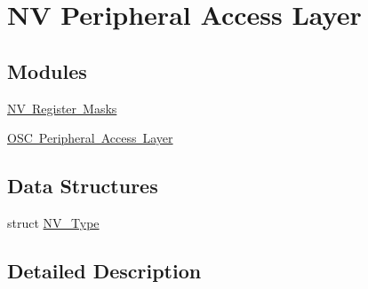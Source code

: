 \hypertarget{group___n_v___peripheral___access___layer}{}\section{NV Peripheral Access Layer}
\label{group___n_v___peripheral___access___layer}
\subsection*{Modules}
\begin{DoxyCompactItemize}
\item 
\mbox{\hyperlink{group___n_v___register___masks}{N\+V Register Masks}}
\item 
\mbox{\hyperlink{group___o_s_c___peripheral___access___layer}{O\+S\+C Peripheral Access Layer}}
\end{DoxyCompactItemize}
\subsection*{Data Structures}
\begin{DoxyCompactItemize}
\item 
struct \mbox{\hyperlink{struct_n_v___type}{N\+V\+\_\+\+Type}}
\end{DoxyCompactItemize}


\subsection{Detailed Description}
